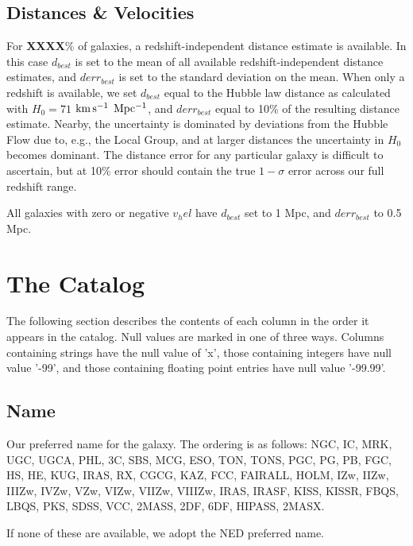 \documentclass[iop]{emulateapj-rtx4}
\newcommand{\kms}{$\rm km\, s^{-1}$}
\begin{document}
\subsection{Distances \& Velocities}
For \textbf{XXXX}\% of galaxies, a redshift-independent distance estimate is available. In this case $d_{best}$ is set to the mean of all available redshift-independent distance estimates, and $derr_{best}$ is set to the standard deviation on the mean. When only a redshift is available, we set $d_{best}$ equal to the Hubble law distance as calculated with $H_0 = 71$ \kms $~\rm Mpc^{-1}$, and $derr_{best}$ equal to 10\% of the resulting distance estimate. Nearby, the uncertainty is dominated by deviations from the Hubble Flow due to, e.g., the Local Group, and at larger distances the uncertainty in $H_0$ becomes dominant. The distance error for any particular galaxy is difficult to ascertain, but at 10\% error should contain the true $1-\sigma$ error across our full redshift range.

All galaxies with zero or negative $v_hel$ have $d_{best}$ set to 1 Mpc, and $derr_{best}$ to 0.5 Mpc. 



\section{The Catalog}
The following section describes the contents of each column in the order it appears in the catalog. Null values are marked in one of three ways. Columns containing strings have the null value of 'x', those containing integers have null value '-99', and those containing floating point entries have null value '-99.99'.

\subsection{Name}
Our preferred name for the galaxy. The ordering is as follows: NGC, IC, MRK, UGC, UGCA, PHL, 3C, SBS, MCG, ESO, TON, TONS, PGC, PG, PB, FGC, HS, HE, KUG, IRAS, RX, CGCG, KAZ, FCC, FAIRALL, HOLM, IZw, IIZw, IIIZw, IVZw, VZw, VIZw, VIIZw, VIIIZw, IRAS, IRASF, KISS, KISSR, FBQS, LBQS, PKS, SDSS, VCC, 2MASS, 2DF, 6DF, HIPASS, 2MASX.


If none of these are available, we adopt the NED preferred name.
\end{document}
